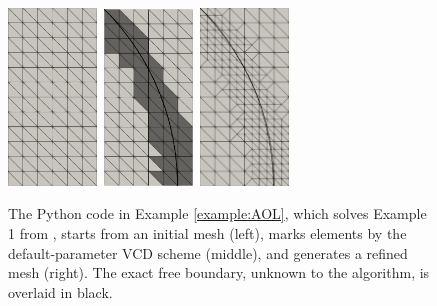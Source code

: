 \documentclass[]{interact}
\theoremstyle{plain}%
\theoremstyle{definition}
\theoremstyle{remark}
\begin{document}
\begin{figure}[ht]
\centering
\mbox{\includegraphics[width=0.21\textwidth]{static/aol-mesh0.png} \qquad\quad
\includegraphics[width=0.21\textwidth]{static/aol-marked.png} \qquad\quad
\includegraphics[width=0.21\textwidth]{static/aol-mesh1.png}}
\caption{The Python code in Example \ref{example:AOL}, which solves Example 1 from \cite{AinsworthOdenLee1993}, starts from an initial mesh (left), marks elements by the default-parameter VCD scheme (middle), and generates a refined mesh (right).  The exact free boundary, unknown to the algorithm, is overlaid in black.}
\label{fig:resultAOL}
\end{figure}
\end{document}

